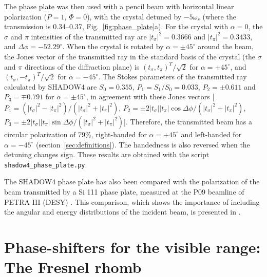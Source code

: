 \documentclass{iucr}
\begin{document}
The phase plate was then used with a pencil beam with horizontal linear polarization ($P=1$, $\Phi=0$), with the crystal detuned by $-5\omega_s$ (where the transmission is 0.34--0.37, Fig.~\ref{fig:phase_plate}a). For the crystal with $\alpha=0$, the $\sigma$ and $\pi$ intensities of the transmitted ray are $|t_\sigma|^2=0.3666$ and $|t_\pi|^2=0.3433$, and $\Delta\phi=-52.29^\circ$. When the crystal is rotated by $\alpha=\pm45^\circ$ around the beam, the Jones vector of the transmitted ray in the standard basis of the crystal (the $\sigma$ and $\pi$ directions of the diffraction plane) is $(t_\sigma, t_\pi)^T/\sqrt{2}$ for $\alpha=+45^\circ$, and $(t_\sigma, -t_\pi)^T/\sqrt{2}$ for $\alpha=-45^\circ$. The Stokes parameters of the transmitted ray calculated by SHADOW4 are $S_0=0.355$, $P_1=S_1/S_0=0.033$, $P_2=\pm0.611$ and $P_3=\mp0.791$ for $\alpha=\pm45^\circ$, in agreement with these Jones vectors [$P_1=(|t_\sigma|^2-|t_\pi|^2)/(|t_\sigma|^2+|t_\pi|^2)$, $P_2=\pm2|t_\sigma||t_\pi|\cos\Delta\phi/(|t_\sigma|^2+|t_\pi|^2)$, $P_3=\pm2|t_\sigma||t_\pi|\sin\Delta\phi/(|t_\sigma|^2+|t_\pi|^2)$]. Therefore, the transmitted beam has a circular polarization of 79\%, right-handed for $\alpha=+45^\circ$ and left-handed for $\alpha=-45^\circ$ (section~\ref{sec:definitions}). The handedness is also reversed when the detuning changes sign. These results are obtained with the script {\tt shadow4\_phase\_plate.py}.

The SHADOW4 phase plate has also been compared with the polarization of the beam transmitted by a Si 111 phase plate, measured at the P09 beamline of PETRA III (DESY) \cite{Strempfer2013,Francoual2013}. This comparison, which shows the importance of including the angular and energy distributions of the incident beam, is presented in \cite{SanchezdelRio2026desy}.




\section{Phase-shifters for the visible range: The Fresnel rhomb}\label{sec:visible_phaseshifters}
\end{document}
